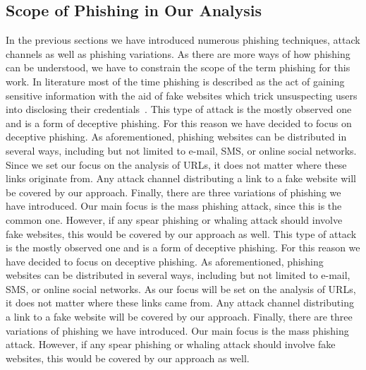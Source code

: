 \subsection{Scope of Phishing in Our Analysis}
\label{s:scope}
In the previous sections we have introduced numerous phishing techniques, attack channels as well as phishing variations. As there are more ways of how phishing can be understood, we have to constrain the scope of the term phishing for this work. In literature most of the time phishing is described as the act of gaining sensitive information with the aid of fake websites which trick unsuspecting users into disclosing their credentials~\cite{sheng2007antiphishingphil, antiphishingtrendreport2013, kasperskyreport2013}.
This type of attack is the mostly observed one and is a form of deceptive phishing. For this reason we have decided to focus on deceptive phishing. As aforementioned, phishing websites can be distributed in several ways, including but not limited to e-mail, SMS, or online social networks. Since we set our focus on the analysis of URLs, it does not matter where these links originate from. Any attack channel distributing a link to a fake website will be covered by our approach. Finally, there are three variations of phishing we have introduced. Our main focus is the mass phishing attack, since this is the common one. However, if any spear phishing or whaling attack should involve fake websites, this would be covered by our approach as well.
This type of attack is the mostly observed one and is a form of deceptive phishing. For this reason we have decided to focus on deceptive phishing. As aforementioned, phishing websites can be distributed in several ways, including but not limited to e-mail, SMS, or online social networks. As our focus will be set on the analysis of URLs, it does not matter where these links came from. Any attack channel distributing a link to a fake website will be covered by our approach. Finally, there are three variations of phishing we have introduced. Our main focus is the mass phishing attack. However, if any spear phishing or whaling attack should involve fake websites, this would be covered by our approach as well.

